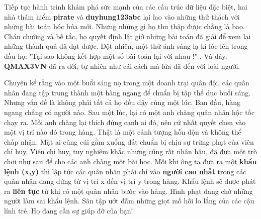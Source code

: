 Tiếp tục hành trình khám phá sức mạnh của các cấu trúc dữ liệu đặc biệt, hai nhà thám hiểm   \textbf{pirate}   và   \textbf{duyhung123abc}   lại lao vào những thử thách với những bài toán hóc búa mới. Nhưng những gì họ thu thập được chẳng là bao. Chán chường và bế tắc, họ quyết định lật giở những bài toán đã giải để xem lại những thành quả đã đạt được. Đột nhiên, một thứ ánh sáng lạ kì lóe lên trong đầu họ:   "Tại sao không kết hợp một số bài toán lại với nhau !"   . Và đây,   \textbf{    QMAX3VN   }   đã ra đời, tự nhiên như cái cách mà lửa đã đến với loài người.  

   Chuyện kể rằng vào một buổi sáng nọ trong một doanh trại quân đội, các quân nhân đang tập trung thành một hàng ngang để chuẩn bị tập thể dục buổi sáng. Nhưng vấn đề là không phải tất cả họ đều dậy cùng một lúc. Ban đầu, hàng ngang chẳng có người nào. Sau một lúc, lại có một anh chàng quân nhân hộc tốc chạy ra. Mỗi anh chàng lại thích đứng cạnh ai đó, nên cứ nhất quyết chen vào một vị trí nào đó trong hàng. Thật là một cảnh tượng hỗn độn và không thể chấp nhận. Mặt ai cũng cúi gằm xuống đất chuẩn bị chịu sự trừng phạt của viên chỉ huy. Viên chỉ huy, tuy nghiêm khắc nhưng cũng rất nhân hậu, đã đưa một trò chơi như sau để cho các anh chàng một bài học. Mỗi khi ông ta đưa ra một   \textbf{    khẩu lệnh (x,y)   }   thì lập tức các quân nhân phải chỉ vào   \textbf{    người cao nhất   }   trong các quân nhân đang đứng từ vị trí x đến vị trí y trong hàng. Khẩu lệnh sẽ được phát ra   \textbf{    liên tục   }   từ khi có một quân nhân bước vào hàng. Hình phạt đang chờ những người làm sai khẩu lệnh. Sân tập ướt đẫm những giọt mồ hồi lo lắng của các cậu lính trẻ. Họ đang cần sự giúp đỡ của bạn!
